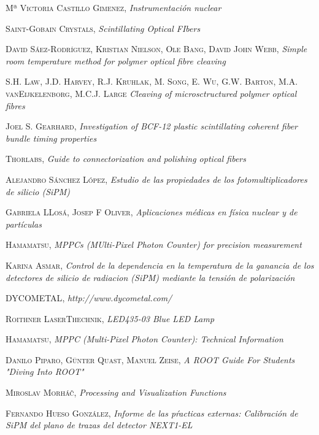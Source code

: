 \begin{thebibliography}{99}
 \textsc{Mª Victoria Castillo Gimenez},
\textit{Instrumentación nuclear} 

 \textsc{Saint-Gobain Crystals},
\textit{Scintillating Optical FIbers}

 \textsc{David Sáez-Rodríguez}, \textsc{Kristian Nielson}, \textsc{Ole Bang}, \textsc{David John Webb},
\textit{Simple room temperature method for polymer optical fibre cleaving}

 \textsc{S.H. Law}, \textsc{J.D. Harvey}, \textsc{R.J. Kruhlak}, \textsc{M. Song}, \textsc{E. Wu}, \textsc{G.W. Barton}, \textsc{M.A. vanEijkelenborg}, \textsc{M.C.J. Large}
\textit{Cleaving of microsctructured polymer optical fibres}

 \textsc{Joel S. Gearhard},
\textit{Investigation of BCF-12 plastic scintillating coherent fiber bundle timing properties}

 \textsc{Thorlabs},
\textit{Guide to connectorization and polishing optical fibers}

 \textsc{Alejandro Sánchez López},
\textit{Estudio de las propiedades de los fotomultiplicadores de silicio (SiPM)}

 \textsc{Gabriela LLosá}, \textsc{Josep F Oliver},
\textit{Aplicaciones médicas en física nuclear y de partículas}

 \textsc{Hamamatsu},
\textit{MPPCs (MUlti-Pixel Photon Counter) for precision measurement}

 \textsc{Karina Asmar},
\textit{Control de la dependencia en la temperatura de la ganancia de los detectores de silicio de radiacion (SiPM) mediante la tensión de polarización}

 \textsc{DYCOMETAL},
\textit{http://www.dycometal.com/}

 \textsc{Roithner LaserThechnik},
\textit{LED435-03 Blue LED Lamp}

 \textsc{Hamamatsu},
\textit{MPPC (Multi-Pixel Photon Counter): Technical Information}

 \textsc{Danilo Piparo}, \textsc{Günter Quast}, \textsc{Manuel Zeise},
\textit{A ROOT Guide For Students "Diving Into ROOT"}

 \textsc{Miroslav Morháč},
\textit{Processing and Visualization Functions}

 \textsc{Fernando Hueso González},
\textit{Informe de las pŕacticas externas: Calibración de SiPM del plano de trazas del detector NEXT1-EL}


\end{thebibliography}
